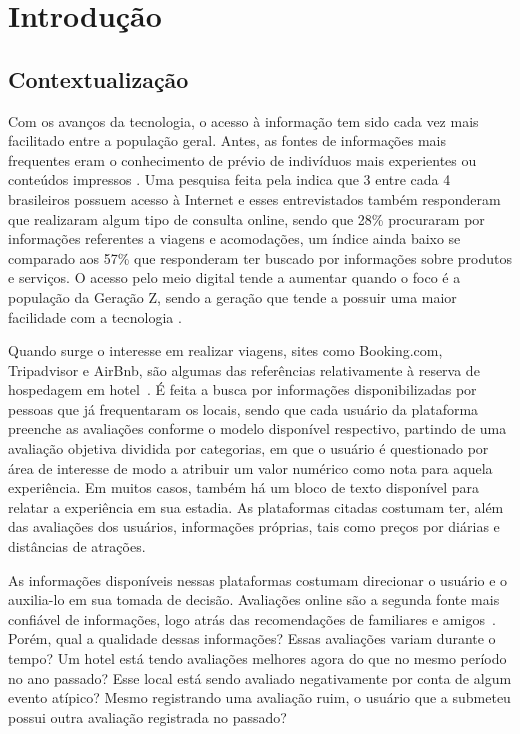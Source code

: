 
\chapter[Introdução]{Introdução}
\label{cap:intro}

\section{Contextualização}

Com os avanços da tecnologia, o acesso à informação tem sido cada vez mais facilitado entre a população geral. Antes, as fontes de informações mais frequentes eram o conhecimento de prévio de indivíduos mais experientes ou conteúdos impressos \cite{jayathilake2021critical}. Uma pesquisa feita pela  indica que 3 entre cada 4 brasileiros possuem acesso à Internet e esses entrevistados também responderam que realizaram algum tipo de consulta online, sendo que 28\% procuraram por informações referentes a viagens e acomodações, um índice ainda baixo se comparado aos 57\% que responderam ter buscado por informações sobre produtos e serviços. O acesso pelo meio digital tende a aumentar quando o foco é a população da Geração Z, sendo a geração que tende a possuir uma maior facilidade com a tecnologia \cite{sfodera2022technology}.

Quando surge o interesse em realizar viagens, sites como Booking.com, Tripadvisor e AirBnb, são algumas das referências relativamente à reserva de hospedagem em hotel~. É feita a busca por informações disponibilizadas por pessoas que já frequentaram os locais, sendo que cada usuário da plataforma preenche as avaliações conforme o modelo disponível respectivo, partindo de uma avaliação objetiva dividida por categorias, em que o usuário é questionado por área de interesse de modo a atribuir um valor numérico como nota para aquela experiência. Em muitos casos, também há um bloco de texto disponível para relatar a experiência em sua estadia. As plataformas citadas costumam ter, além das avaliações dos usuários, informações próprias, tais como preços por diárias e distâncias de atrações.

As informações disponíveis nessas plataformas costumam direcionar o usuário e o auxilia-lo em sua tomada de decisão. Avaliações online são a segunda fonte mais confiável de informações, logo atrás das recomendações de familiares e amigos~\cite{chatterjee2020drivers}. Porém, qual a qualidade dessas informações? Essas avaliações variam durante o tempo? Um hotel está tendo avaliações melhores agora do que no mesmo período no ano passado? Esse local está sendo avaliado negativamente por conta de algum evento atípico? Mesmo registrando uma avaliação ruim, o usuário que a submeteu possui outra avaliação registrada no passado?

